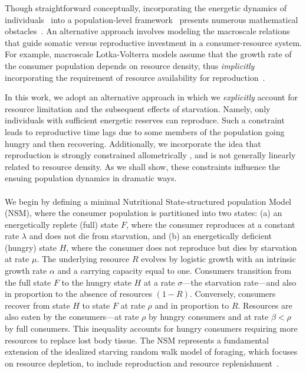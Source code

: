 \documentclass{pnastwo}
\begin{document}
\begin{article}
Though straightforward conceptually, incorporating the energetic dynamics of individuals~\cite{Kooi2000} into a population-level framework~\cite{Kooi2000,Sousa:2010ez} presents numerous mathematical obstacles~\cite{Diekmann:2010da}.  
An alternative approach involves modeling the macroscale relations that guide somatic versus reproductive investment in a consumer-resource system.
For example, macroscale Lotka-Volterra models assume that the growth rate of the consumer population depends on resource density, thus \emph{implicitly} incorporating the requirement of resource availability for reproduction~\cite{murdoch:2003}.

In this work, we adopt an alternative approach in which we \emph{explicitly} account for resource limitation and the subsequent effects of starvation.
Namely, only individuals with sufficient energetic reserves can reproduce.
Such a constraint leads to reproductive time lags due to some members of the population going hungry and then recovering.  
Additionally, we incorporate the idea that reproduction is strongly constrained allometrically \cite{Kempes:2012hy}, and is not generally linearly related to resource density.  
As we shall show, these constraints influence the ensuing population dynamics in dramatic ways.
\\

\\
We begin by defining a minimal Nutritional State-structured population Model (NSM), where the consumer population is partitioned into two states: (a) an energetically replete (full) state $F$, where the consumer reproduces at a constant rate $\lambda$ and does not die from starvation, and (b) an energetically deficient (hungry) state $H$, where the consumer does not reproduce but dies by starvation at rate $\mu$.  
The underlying resource $R$ evolves by logistic growth with an intrinsic growth rate $\alpha$ and a carrying capacity equal to one.  
Consumers transition from the full state $F$ to the hungry state $H$ at a rate $\sigma$---the starvation rate---and also in proportion to the absence of resources $(1-R)$.  Conversely, consumers recover from state $H$ to state $F$ at rate $\rho$ and in proportion to $R$. 
Resources are also eaten by the consumers---at rate $\rho$ by hungry consumers and at rate $\beta<\rho$ by full consumers.  
This inequality accounts for hungry consumers requiring more resources to replace lost body tissue.  
The NSM represents a fundamental extension of the idealized starving random walk model of foraging, which focuses on resource depletion, to include reproduction and resource replenishment~\cite{Benichou:2014wu,Benichou:2016wl,Chupeau:2016jf}.


\end{article}
\end{document}
